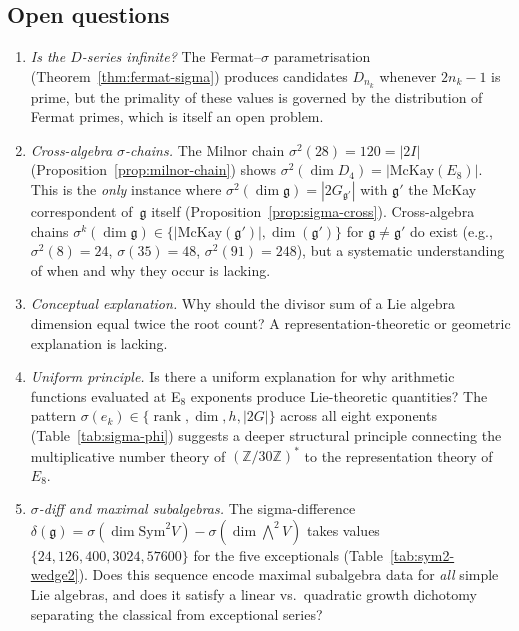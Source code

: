 \documentclass[11pt]{amsart}
\theoremstyle{plain}
\theoremstyle{definition}
\theoremstyle{remark}
\newcommand{\fg}{\mathfrak{g}}
\newcommand{\rank}{\operatorname{rank}}
\begin{document}
\subsection{Open questions}

\begin{enumerate}
  \item \emph{Is the $D$-series infinite?}  The Fermat--$\sigma$
    parametrisation (Theorem~\ref{thm:fermat-sigma}) produces candidates
    $D_{n_k}$ whenever $2n_k - 1$ is prime, but the primality of these
    values is governed by the distribution of Fermat primes, which is
    itself an open problem.

  \item \emph{Cross-algebra $\sigma$-chains.}
    The Milnor chain $\sigma^2(28) = 120 = |2I|$
    (Proposition~\ref{prop:milnor-chain}) shows
    $\sigma^2(\dim D_4) = |\text{McKay}(E_8)|$.  This is the
    \emph{only} instance where $\sigma^2(\dim\fg) = |2G_{\fg'}|$ with
    $\fg'$ the McKay correspondent of~$\fg$ itself
    (Proposition~\ref{prop:sigma-cross}).  Cross-algebra chains
    $\sigma^k(\dim\fg) \in \{|\text{McKay}(\fg')|, \dim(\fg')\}$ for
    $\fg \ne \fg'$ do exist (e.g., $\sigma^2(8) = 24$,
    $\sigma(35) = 48$, $\sigma^2(91) = 248$), but a systematic
    understanding of when and why they occur is lacking.

  \item \emph{Conceptual explanation.}  Why should the divisor sum
    of a Lie algebra dimension equal twice the root count?
    A representation-theoretic or geometric explanation is lacking.

  \item \emph{Uniform principle.}  Is there a uniform explanation for
    why arithmetic functions evaluated at E$_8$ exponents produce
    Lie-theoretic quantities?  The pattern
    $\sigma(e_k) \in \{\rank, \dim, h, |2G|\}$ across all eight
    exponents (Table~\ref{tab:sigma-phi}) suggests a deeper structural
    principle connecting the multiplicative number theory of
    $(\mathbb{Z}/30\mathbb{Z})^*$ to the representation theory of~$E_8$.

  \item \emph{$\sigma$-diff and maximal subalgebras.}
    The sigma-difference $\delta(\fg) = \sigma(\dim\mathrm{Sym}^2 V)
    - \sigma(\dim\bigwedge^2 V)$ takes values
    $\{24, 126, 400, 3024, 57600\}$ for the five exceptionals
    (Table~\ref{tab:sym2-wedge2}).  Does this sequence encode maximal
    subalgebra data for \emph{all} simple Lie algebras, and does it
    satisfy a linear vs.\ quadratic growth dichotomy separating the
    classical from exceptional series?


\end{enumerate}
\end{document}
